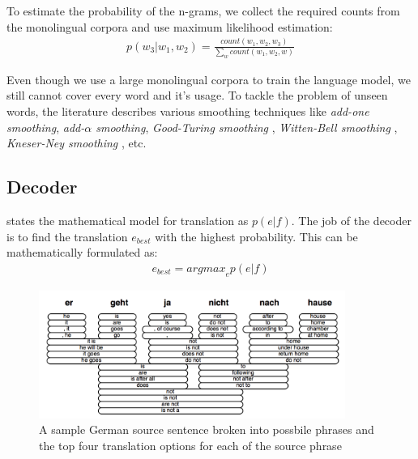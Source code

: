 To estimate the probability of the n-grams, we collect the required counts from the monolingual corpora and use maximum likelihood estimation:
\begin{eqnarray}
p(w_3|w_1, w_2) = \frac{count(w_1, w_2, w_3)}{\sum_{w} count(w_1, w_2, w)}
\end{eqnarray}

Even though we use a large monolingual corpora to train the language model, we still cannot cover every word and it's usage. To tackle the problem of unseen words, the literature describes various smoothing techniques like \textit{add-one smoothing}, \textit{add-$\alpha$ smoothing}, \textit{Good-Turing smoothing} \cite{Good1953}, \textit{Witten-Bell smoothing} \cite{WittenBell1991}, \textit{Kneser-Ney smoothing} \cite{KneserNey1995}, etc. 

\subsection{Decoder}\label{intro-decoder}
\cite{Koehn2003} states the mathematical model for translation as $p(e|f)$. The job of the decoder is to find the translation $e_{best}$ with the highest probability. This can be mathematically formulated as:
\begin{eqnarray}
	e_{best} = {argmax}_e p(e|f)
\end{eqnarray}

\begin{figure}[h]
	\includegraphics[width=10cm]{files/images/translation-options}
	\centering
	\caption{A sample German source sentence broken into possbile phrases and the top four translation options for each of the source phrase \cite{Koehn2009}}
	\label{fig:sample-translation-options}
\end{figure}


